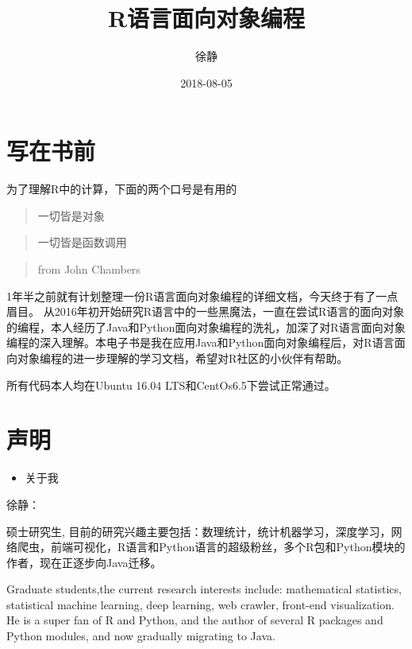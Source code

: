 \documentclass[]{book}
\title{R语言面向对象编程}
\author{徐静}
\date{2018-08-05}
\providecommand{\tightlist}{%
  \setlength{\itemsep}{0pt}\setlength{\parskip}{0pt}}
\begin{document}
\maketitle

{
\setcounter{tocdepth}{1}
\tableofcontents
}
\chapter*{写在书前}

为了理解R中的计算，下面的两个口号是有用的

\begin{quote}
一切皆是对象
\end{quote}

\begin{quote}
一切皆是函数调用
\end{quote}

\begin{quote}
from John Chambers
\end{quote}

1年半之前就有计划整理一份R语言面向对象编程的详细文档，今天终于有了一点眉目。
从2016年初开始研究R语言中的一些黑魔法，一直在尝试R语言的面向对象的编程，本人经历了Java和Python面向对象编程的洗礼，加深了对R语言面向对象编程的深入理解。本电子书是我在应用Java和Python面向对象编程后，对R语言面向对象编程的进一步理解的学习文档，希望对R社区的小伙伴有帮助。

所有代码本人均在Ubuntu 16.04 LTS和CentOs6.5下尝试正常通过。

\chapter*{声明}

\begin{itemize}
\tightlist
\item
  关于我
\end{itemize}

徐静：

硕士研究生,
目前的研究兴趣主要包括：数理统计，统计机器学习，深度学习，网络爬虫，前端可视化，R语言和Python语言的超级粉丝，多个R包和Python模块的作者，现在正逐步向Java迁移。

Graduate students,the current research interests include: mathematical
statistics, statistical machine learning, deep learning, web crawler,
front-end visualization. He is a super fan of R and Python, and the
author of several R packages and Python modules, and now gradually
migrating to Java.
\end{document}
